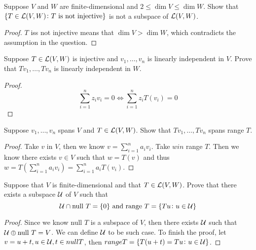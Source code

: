 \documentclass{extarticle}
\begin{document}
\begin{problem}{7}
    Suppose \(V\) and \(W\) are finite-dimensional and \(2 \leq \dim V 
    \leq \dim W\). Show that \(\{T \in \mathcal{L}(V, W) \colon T \text{ is 
    not injective}\}\) is not a subspace of \(\mathcal{L}(V, W)\). 
\end{problem}


\begin{proof}
\(T\) iss not injective means that \(\dim V > \dim W \), which contradicts the 
assumption in the question. 
\end{proof}


\begin{problem}{9}
    Suppose \(T \in \mathcal{L}(V, W)\) is injective and \(v_1, \ldots, v_n\) is 
    linearly independent in \(V\). Prove that \(Tv_1, \ldots, Tv_n\) is 
    linearly independent in \(W\).
\end{problem}

\begin{proof}
\[\sum_{i=1}^{n}z_iv_i = 0 \Leftrightarrow \sum_{i=1}^{n} z_iT(v_i) = 0\]
\end{proof}

\begin{problem}{10}
    Suppose \(v_1, \ldots, v_n\) spans \(V\) and \(T \in \mathcal{L}(V, W)\). Show 
    that \(Tv_1, \ldots, T v_n\) spans range \(T\). 
\end{problem}

\begin{proof}
Take \(v\) in \(V\), then we know \(v = \sum_{i=1}^{n} a_i v_i\). Take \(w in\) range \(T\).
Then we know there exists \(v \in V\) such that \(w = T(v)\) and 
thus \(w = T(\sum_{i=1}^{n} a_i v_i) = \sum_{i=1}^{n}a_i T(v_i)\). 
\end{proof}


\begin{problem}{11}
    Suppose that \(V\) is finite-dimensional and that \(T \in \mathcal{L}(V, W)\). Prove 
    that there exists a subspace \(\mathcal{U}\) of \(V\) such that 
    \[\mathcal{U} \cap \text{null } T = \{0\} \text{   and   } \text{range } T 
    = \{T u \colon u \in \mathcal{U}\}\]
\end{problem}


\begin{proof}
Since we know null \(T\) is a subspace of \(V\), then there exists \(\mathcal{U}\) 
such that \(\mathcal{U} \oplus \text{null }T = V\). We can define \(\mathcal{U}\) to be such 
case. To finish the proof, let \(v = u + t, u \in \mathcal{U}, t \in null T\), then \(range T 
= \{T(u + t) = T u \colon u \in \mathcal{U}\}\). 
\end{proof}
\end{document}
